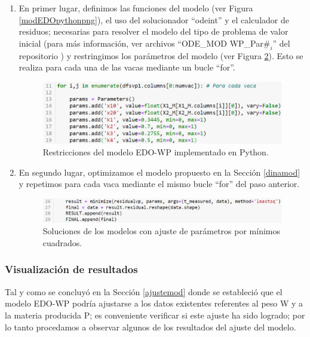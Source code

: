 \begin{enumerate} 
    \item En primer lugar, definimos las funciones del modelo (ver Figura \ref{modEDOpythonpng}), el uso del solucionador ``odeint'' y el calculador de residuos; necesarias para resolver el modelo del tipo de problema de valor inicial (para más información, ver archivos ``ODE\_MOD WP\_Par$\#_{i}$'' del repositorio \cite{msclfggprogrepo}) y restringimos los parámetros del modelo (ver Figura \ref{paramsaddpng}). Esto se realiza para cada una de las vacas mediante un bucle ``for''.
  
        \begin{figure}[H]
            \centering
            \includegraphics[width=\textwidth]{img/paramsadd.png}
            \caption{Restricciones del modelo EDO-WP implementado en Python.}
            \label{paramsaddpng}
        \end{figure}
        
    \item En segundo lugar, optimizamos el modelo propuesto en la Sección \ref{dinamod} y repetimos para cada vaca mediante el mismo bucle ``for'' del paso anterior.
    
        \begin{figure}[H]
            \centering
            \includegraphics[width=\textwidth]{img/minimizefor.png}
            \caption{Soluciones de los modelos con ajuste de parámetros por mínimos cuadrados.}
            \label{paramsaddpng}
        \end{figure}
        
\end{enumerate}

\subsubsection{Visualización de resultados}\label{visualres}

Tal y como se concluyó en la Sección \ref{ajustemod} donde se estableció que el modelo EDO-WP podría ajustarse a los datos existentes referentes al peso W y a la materia producida P; es conveniente verificar si este ajuste ha sido logrado; por lo tanto procedamos a observar algunos de los resultados del ajuste del modelo.


